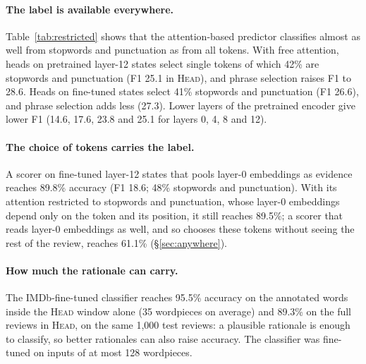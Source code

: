 \documentclass[11pt]{article}
\newcommand{\HEAD}{\textup{\textsc{Head}}}
\begin{document}
\paragraph{The label is available everywhere.}
Table~\ref{tab:restricted} shows that the attention-based predictor classifies almost as well from stopwords and punctuation as from all tokens. With free attention, heads on pretrained layer-12 states select single tokens of which 42\% are stopwords and punctuation (F1 25.1 in \HEAD), and phrase selection raises F1 to 28.6. Heads on fine-tuned states select 41\% stopwords and punctuation (F1 26.6), and phrase selection adds less (27.3). Lower layers of the pretrained encoder give lower F1 (14.6, 17.6, 23.8 and 25.1 for layers 0, 4, 8 and 12).

\paragraph{The choice of tokens carries the label.}
A scorer on fine-tuned layer-12 states that pools layer-0 embeddings as evidence reaches 89.8\% accuracy (F1 18.6; 48\% stopwords and punctuation). With its attention restricted to stopwords and punctuation, whose layer-0 embeddings depend only on the token and its position, it still reaches 89.5\%; a scorer that reads layer-0 embeddings as well, and so chooses these tokens without seeing the rest of the review, reaches 61.1\% (\S\ref{sec:anywhere}).

\paragraph{How much the rationale can carry.}
The IMDb-fine-tuned classifier reaches 95.5\% accuracy on the annotated words inside the \HEAD{} window alone (35 wordpieces on average) and 89.3\% on the full reviews in \HEAD, on the same 1,000 test reviews: a plausible rationale is enough to classify, so better rationales can also raise accuracy. The classifier was fine-tuned on inputs of at most 128 wordpieces.
\end{document}
